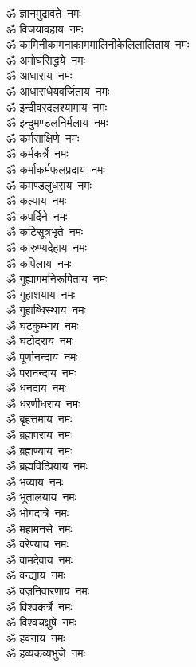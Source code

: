 \begin{multicols}{2}
\begin{flushleft}
ॐ ज्ञानमुद्रावते~नमः\\
ॐ विजयावहाय~नमः\\
ॐ कामिनी\-कामना\-काममालिनी\-केलिलालिताय~नमः\\
ॐ अमोघसिद्धये~नमः\\
ॐ आधाराय~नमः\\
ॐ आधाराधेयवर्जिताय~नमः\\
ॐ इन्दीवरदलश्यामाय~नमः\\
ॐ इन्दुमण्डलनिर्मलाय~नमः\\
ॐ कर्मसाक्षिणे~नमः\\
ॐ कर्मकर्त्रे~नमः\hfill{}\\
ॐ कर्माकर्मफलप्रदाय~नमः\\
ॐ कमण्डलुधराय~नमः\\
ॐ कल्पाय~नमः\\
ॐ कपर्दिने~नमः\\
ॐ कटिसूत्रभृते~नमः\\
ॐ कारुण्यदेहाय~नमः\\
ॐ कपिलाय~नमः\\
ॐ गुह्यागमनिरूपिताय~नमः\\
ॐ गुहाशयाय~नमः\\
ॐ गुहाब्धिस्थाय~नमः\hfill{}\\
ॐ घटकुम्भाय~नमः\\
ॐ घटोदराय~नमः\\
ॐ पूर्णानन्दाय~नमः\\
ॐ परानन्दाय~नमः\\
ॐ धनदाय~नमः\\
ॐ धरणीधराय~नमः\\
ॐ बृहत्तमाय~नमः\\
ॐ ब्रह्मपराय~नमः\\
ॐ ब्रह्मण्याय~नमः\\
ॐ ब्रह्मवित्प्रियाय~नमः\hfill{}\\
ॐ भव्याय~नमः\\
ॐ भूतालयाय~नमः\\
ॐ भोगदात्रे~नमः\\
ॐ महामनसे~नमः\\
ॐ वरेण्याय~नमः\\
ॐ वामदेवाय~नमः\\
ॐ वन्द्याय~नमः\\
ॐ वज्रनिवारणाय~नमः\\
ॐ विश्वकर्त्रे~नमः\\
ॐ विश्वचक्षुषे~नमः\hfill{}\\
ॐ हवनाय~नमः\\
ॐ हव्यकव्यभुजे~नमः\\

\end{flushleft}
\end{multicols}
